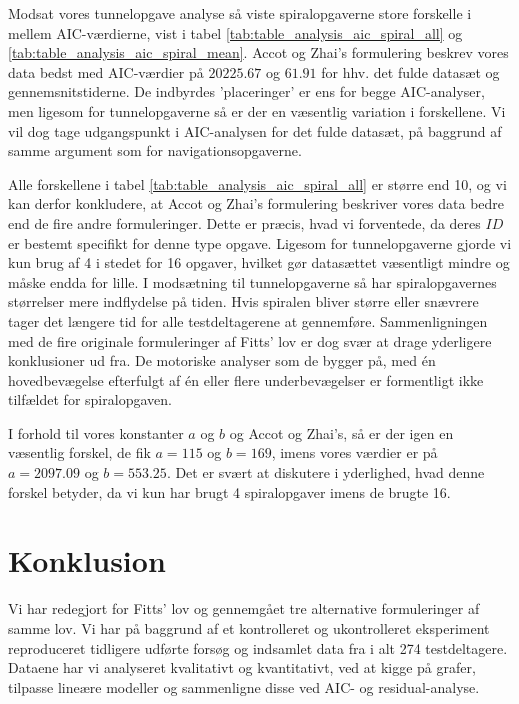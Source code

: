 Modsat vores tunnelopgave analyse så viste spiralopgaverne store forskelle i mellem AIC-værdierne, vist i tabel \ref{tab:table_analysis_aic_spiral_all} og \ref{tab:table_analysis_aic_spiral_mean}. Accot og Zhai's formulering beskrev vores data bedst med AIC-værdier på $20225.67$ og $61.91$ for hhv. det fulde datasæt og gennemsnitstiderne. De indbyrdes 'placeringer' er ens for begge AIC-analyser, men ligesom for tunnelopgaverne så er der en væsentlig variation i forskellene. Vi vil dog tage udgangspunkt i AIC-analysen for det fulde datasæt, på baggrund af samme argument som for navigationsopgaverne.

Alle forskellene i tabel \ref{tab:table_analysis_aic_spiral_all} er større end 10, og vi kan derfor konkludere, at Accot og Zhai's formulering beskriver vores data bedre end de fire andre formuleringer. Dette er præcis, hvad vi forventede, da deres $ID$ er bestemt specifikt for denne type opgave. Ligesom for tunnelopgaverne gjorde vi kun brug af 4 i stedet for 16 opgaver, hvilket gør datasættet væsentligt mindre og måske endda for lille. I modsætning til tunnelopgaverne så har spiralopgavernes størrelser mere indflydelse på tiden. Hvis spiralen bliver større eller snævrere tager det længere tid for alle testdeltagerene at gennemføre. Sammenligningen med de fire originale formuleringer af Fitts' lov er dog svær at drage yderligere konklusioner ud fra. De motoriske analyser som de bygger på, med én hovedbevægelse efterfulgt af én eller flere underbevægelser er formentligt ikke tilfældet for spiralopgaven.

I forhold til vores konstanter $a$ og $b$ og Accot og Zhai's, så er der igen en væsentlig forskel, de fik $a=115$ og $b=169$, imens vores værdier er på $a=2097.09$ og $b=553.25$. Det er svært at diskutere i yderlighed, hvad denne forskel betyder, da vi kun har brugt 4 spiralopgaver imens de brugte 16.

\chapter*{Konklusion}
Vi har redegjort for Fitts' lov og gennemgået tre alternative formuleringer af samme lov. Vi har på baggrund af et kontrolleret og ukontrolleret eksperiment reproduceret tidligere udførte forsøg og indsamlet data fra i alt 274 testdeltagere. Dataene har vi analyseret kvalitativt og kvantitativt, ved at kigge på grafer, tilpasse lineære modeller og sammenligne disse ved AIC- og residual-analyse. 

